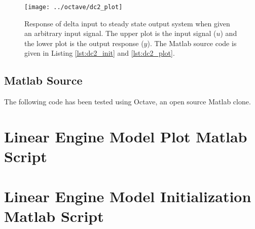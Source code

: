 \documentclass{article}
\begin{document}
\begin{figure}[htbp!]
\texttt{[image: ../octave/dc2\_plot]}
\caption{Response of delta input to steady state output system
when given an arbitrary input signal.
The upper plot is the input signal ($u$) and the lower plot is
the output response ($y$).
The Matlab source code is given in Listing \ref{lst:dc2_init}
and \ref{lst:dc2_plot}.
}
\label{fig:dc2_plot}
\end{figure}

\clearpage
\subsection{Matlab Source}
\label{app:dcsrc}

The following code has been tested using Octave\autocite{octave},
an open source Matlab clone.

%
%
%






\clearpage
\section{Linear Engine Model Plot Matlab Script}
\label{app:olplot}


\section{Linear Engine Model Initialization Matlab Script}

\end{document}
